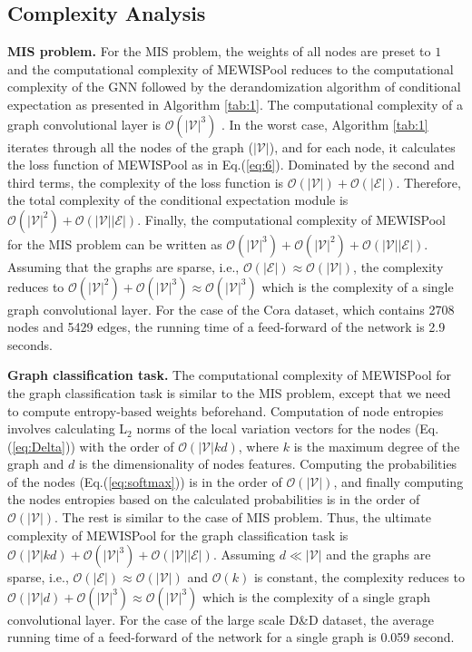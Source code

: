 \documentclass{article}
\begin{document}
\subsection{Complexity Analysis}\label{subsec:ca}


\textbf{MIS problem.} For the MIS problem, the weights of all nodes are preset to $1$ and the computational complexity of MEWISPool reduces to the computational complexity of the GNN followed by the derandomization algorithm of conditional expectation as presented in Algorithm \ref{tab:1}. The computational complexity of a graph convolutional layer is $\mathcal{O}(|\mathcal{V}|^3)$ \cite{structpool}. In the worst case, Algorithm \ref{tab:1} iterates through all the nodes of the graph ($|\mathcal{V}|$), and for each node, it calculates the loss function of MEWISPool as in Eq.(\ref{eq:6}).
Dominated by the second and third terms, the complexity of the loss function is $\mathcal{O}(|\mathcal{V}|) + \mathcal{O}(|\mathcal{E}|)$. Therefore, the total complexity of the conditional expectation module is $\mathcal{O}(|\mathcal{V}|^2) + \mathcal{O}(|\mathcal{V}||\mathcal{E}|)$. Finally, the computational complexity of MEWISPool for the MIS problem can be written as $\mathcal{O}(|\mathcal{V}|^3) + \mathcal{O}(|\mathcal{V}|^2) + \mathcal{O}(|\mathcal{V}||\mathcal{E}|)$. Assuming that the graphs are sparse, i.e., $\mathcal{O}(|\mathcal{E}|) \approx \mathcal{O}(|\mathcal{V}|)$, the complexity reduces to $\mathcal{O}(|\mathcal{V}|^2) + \mathcal{O}(|\mathcal{V}|^3) \approx \mathcal{O}(|\mathcal{V}|^3)$ which is the complexity of a single graph convolutional layer. For the case of the Cora dataset, which contains 2708 nodes and 5429 edges, the running time of a feed-forward of the network is 2.9 seconds.

\textbf{Graph classification task.} 
The computational complexity of MEWISPool for the graph classification task is similar to the MIS problem, except that we need to compute entropy-based weights beforehand. Computation of node entropies involves calculating L$_2$ norms of the local variation vectors for the nodes (Eq.(\ref{eq:Delta})) with the order of $\mathcal{O}(|\mathcal{V}| k d)$, where $k$ is the maximum degree of the graph and $d$ is the dimensionality of nodes features.
Computing the probabilities of the nodes (Eq.(\ref{eq:softmax})) is in the order of $\mathcal{O}(|\mathcal{V}|)$, and finally computing the nodes entropies based on the calculated probabilities is in the order of $\mathcal{O}(|\mathcal{V}|)$. The rest is similar to the case of MIS problem. Thus, the ultimate complexity of MEWISPool for the graph classification task is $\mathcal{O}(|\mathcal{V}| k d) + \mathcal{O}(|\mathcal{V}|^3) + \mathcal{O}(|\mathcal{V}||\mathcal{E}|)$. Assuming $d \ll |\mathcal{V}|$ and the graphs are sparse, i.e., $\mathcal{O}(|\mathcal{E}|) \approx \mathcal{O}(|\mathcal{V}|)$ and $\mathcal{O}(k)$ is constant, the complexity reduces to $\mathcal{O}(|\mathcal{V}| d) + \mathcal{O}(|\mathcal{V}|^3) \approx \mathcal{O}(|\mathcal{V}|^3)$ which is the complexity of a single graph convolutional layer. For the case of the large scale D\&D dataset, the average running time of a feed-forward of the network for a single graph is 0.059 second.
\end{document}

